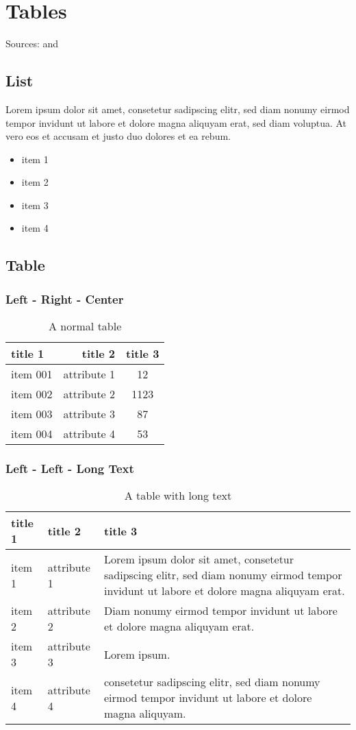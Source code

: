 \chapter{Tables}
Sources: \cite{wb-list} and \cite{wb-tables}

\section{List}
Lorem ipsum dolor sit amet, consetetur sadipscing elitr, sed diam nonumy eirmod tempor invidunt ut labore et dolore magna aliquyam erat, sed diam voluptua. At vero eos et accusam et justo duo dolores et ea rebum.
\begin{itemize}
	\item item 1
	\item item 2
	\item item 3
	\item item 4
\end{itemize}

\section{Table}

\subsection{Left - Right - Center}
\begin{table}[H]
	\centering
	\begin{tabular}{| l | r | c |}
		\textbf{title 1} & \textbf{title 2} & \textbf{title 3} \\
		\hline
		item 001 & attribute 1 & 12 \\
		item 002 & attribute 2 & 1123 \\
		item 003 & attribute 3 & 87 \\
		item 004 & attribute 4 & 53 
	\end{tabular}
	\caption{A normal table}
	\label{tab:normal-table}
\end{table}

\subsection{Left - Left - Long Text}
\begin{table}[H]
	\centering
	\begin{tabular}{ l | l | p{10cm} }
		\textbf{title 1} & \textbf{title 2} & \textbf{title 3} \\
		\hline
		item 1 & attribute 1 & Lorem ipsum dolor sit amet, consetetur sadipscing elitr, sed diam nonumy eirmod tempor invidunt ut labore et dolore magna aliquyam erat. \\
		item 2 & attribute 2 & Diam nonumy eirmod tempor invidunt ut labore et dolore magna aliquyam erat. \\
		item 3 & attribute 3 & Lorem ipsum. \\
		item 4 & attribute 4 & consetetur sadipscing elitr, sed diam nonumy eirmod tempor invidunt ut labore et dolore magna aliquyam. 
	\end{tabular}
	\caption{A table with long text}
\end{table}

